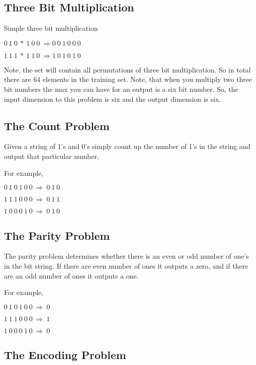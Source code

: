 \subsection{Three Bit Multiplication}
	
	Simple three bit multiplication

	$0\  1\  0\   *\  1\  0\  0\   \Longrightarrow  0\ 0\ 1\ 0\ 0\ 0$

        $1\  1\  1\   *\  1\  1\  0\   \Longrightarrow  1\ 0\ 1\ 0\ 1\ 0$

	Note, the set will contain all permutations of three bit
multiplication.  So in total there are 64 elements in the training set.
Note, that when you multiply two three bit numbers the max you can
have for an output is a six bit number.  So, the input dimension to
this problem is six and the output dimension is six.
	

\subsection{The Count Problem}

	Given a string of 1's and 0's simply count up the number of
1's in the string and output that particular number.

	For example,
		
		$0\  1\  0\  1\  0\  0\  \Longrightarrow \ 0\  1\  0$

                $1\  1\  1\  0\  0\  0\  \Longrightarrow \ 0\  1\  1$

                $1\  0\  0\  0\  1\  0\  \Longrightarrow \ 0\  1\  0$

\subsection{The Parity Problem}

	The parity problem determines whether there is an even or odd
number of one's in the bit string.  If there are even number of ones
it outputs a zero, and if there are an odd number of ones it outputs a
one. 

	For example,

		$0\  1\  0\  1\  0\  0\  \Longrightarrow \ 0$

                $1\  1\  1\  0\  0\  0\  \Longrightarrow \ 1$

                $1\  0\  0\  0\  1\  0\  \Longrightarrow \ 0$

\subsection{The Encoding Problem}

